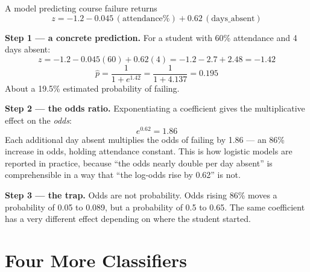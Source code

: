 \begin{worked}
A model predicting course failure returns
\[
z = -1.2 - 0.045\,(\text{attendance\%}) + 0.62\,(\text{days\_absent})
\]

\smallskip
\textbf{Step 1 --- a concrete prediction.} For a student with 60\% attendance and
4 days absent:
\[
z = -1.2 - 0.045(60) + 0.62(4) = -1.2 - 2.7 + 2.48 = -1.42
\]
\[
\hat{p} = \frac{1}{1+e^{1.42}} = \frac{1}{1+4.137} = 0.195
\]
About a 19.5\% estimated probability of failing.

\smallskip
\textbf{Step 2 --- the odds ratio.} Exponentiating a coefficient gives the
multiplicative effect on the \emph{odds}:
\[
e^{0.62} = 1.86
\]
Each additional day absent multiplies the odds of failing by 1.86 --- an 86\%
increase in odds, holding attendance constant. This is how logistic models are
reported in practice, because ``the odds nearly double per day absent'' is
comprehensible in a way that ``the log-odds rise by 0.62'' is not.

\smallskip
\textbf{Step 3 --- the trap.} Odds are not probability. Odds rising 86\% moves a
probability of 0.05 to 0.089, but a probability of 0.5 to 0.65. The same
coefficient has a very different effect depending on where the student started.
\end{worked}

\section{Four More Classifiers}

